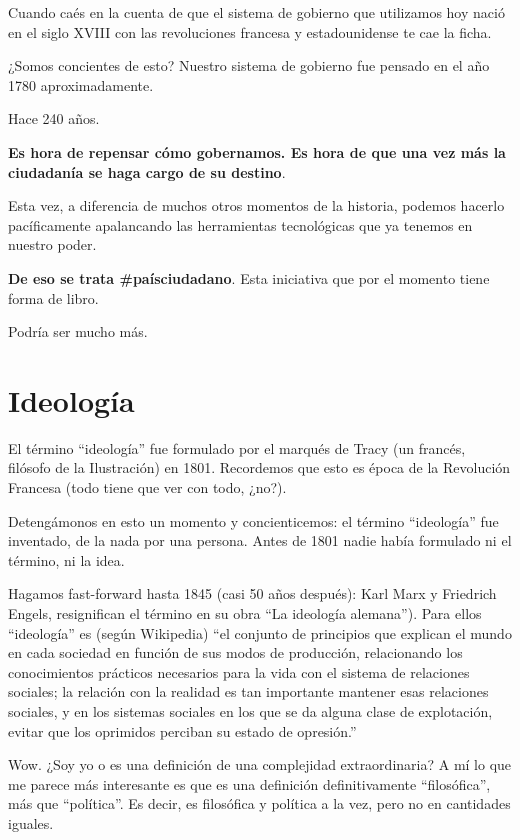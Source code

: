 \documentclass[
]{book}
\begin{document}
Cuando caés en la cuenta de que el sistema de gobierno que utilizamos hoy nació en el siglo XVIII con las revoluciones francesa y estadounidense te cae la ficha.

¿Somos concientes de esto? Nuestro sistema de gobierno fue pensado en el año 1780 aproximadamente.

Hace 240 años.

\textbf{Es hora de repensar cómo gobernamos. Es hora de que una vez más la ciudadanía se haga cargo de su destino}.

Esta vez, a diferencia de muchos otros momentos de la historia, podemos hacerlo pacíficamente apalancando las herramientas tecnológicas que ya tenemos en nuestro poder.

\textbf{De eso se trata \#paísciudadano}. Esta iniciativa que por el momento tiene forma de libro.

Podría ser mucho más.

\hypertarget{ideologuxeda}{%
\chapter{Ideología}\label{ideologuxeda}}

El término ``ideología'' fue formulado por el marqués de Tracy (un francés, filósofo de la Ilustración) en 1801. Recordemos que esto es época de la Revolución Francesa (todo tiene que ver con todo, ¿no?).

Detengámonos en esto un momento y concienticemos: el término ``ideología'' fue inventado, de la nada por una persona. Antes de 1801 nadie había formulado ni el término, ni la idea.

Hagamos fast-forward hasta 1845 (casi 50 años después): Karl Marx y Friedrich Engels, resignifican el término en su obra ``La ideología alemana''). Para ellos ``ideología'' es (según Wikipedia) ``el conjunto de principios que explican el mundo en cada sociedad en función de sus modos de producción, relacionando los conocimientos prácticos necesarios para la vida con el sistema de relaciones sociales; la relación con la realidad es tan importante mantener esas relaciones sociales, y en los sistemas sociales en los que se da alguna clase de explotación, evitar que los oprimidos perciban su estado de opresión.''

Wow. ¿Soy yo o es una definición de una complejidad extraordinaria? A mí lo que me parece más interesante es que es una definición definitivamente ``filosófica'', más que ``política''. Es decir, es filosófica y política a la vez, pero no en cantidades iguales.
\end{document}
